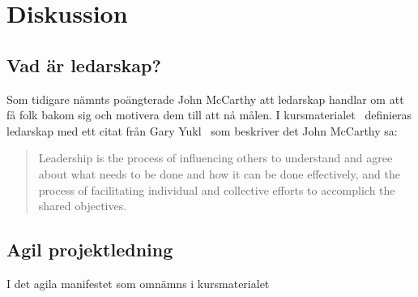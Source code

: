 \section{Diskussion}

\subsection{Vad är ledarskap?}
Som tidigare nämnts poängterade John McCarthy att ledarskap handlar om att få folk bakom sig och motivera dem till att nå målen. I kursmaterialet~\citep{leadership} definieras ledarskap med ett citat från Gary Yukl~\citep{yukl} som beskriver det John McCarthy sa:
\begin{quote}
Leadership is the process of influencing others to understand 
and agree about what needs to be done and how it can be 
done effectively, and the process of facilitating individual and 
collective efforts to accomplich the shared objectives.
\end{quote}

\subsection{Agil projektledning}
I det agila manifestet som omnämns i kursmaterialet~\citep{projekt}